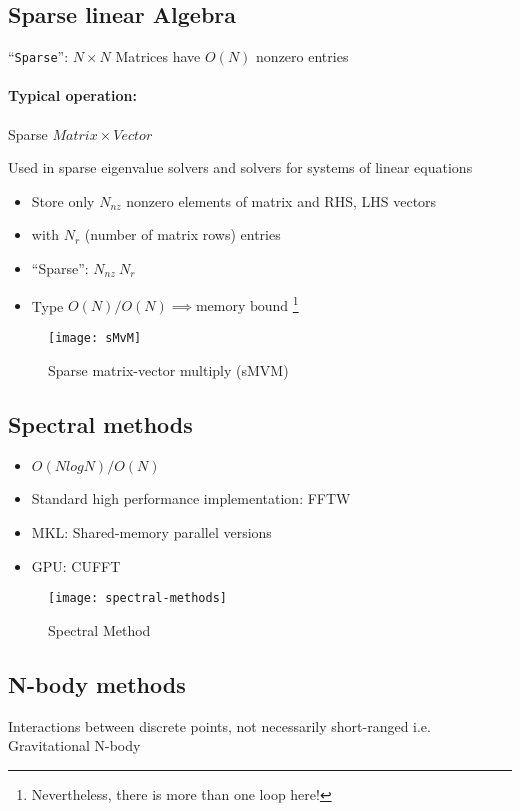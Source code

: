 \subsection{Sparse linear Algebra}
“\verb|Sparse|”: $ N \times N $ Matrices have $ O(N) $ nonzero entries

\paragraph{Typical operation:} Sparse $ Matrix \times Vector $

Used in sparse eigenvalue solvers and solvers for systems of linear equations
\begin{itemize}
    \item Store only $ N_{nz} $ nonzero elements of matrix and RHS, LHS vectors
    \item with $ N_r $ (number of matrix rows) entries
    \item “Sparse”: $ N_{nz} ~ N_r $
    \item Type $ O(N)/O(N) \implies \text{memory bound} $ \footnote{Nevertheless, there is more than one loop here!}
\end{itemize}

\begin{figure}[!htbp]
    \centering
    \texttt{[image: sMvM]}
    \caption{Sparse matrix-vector multiply (sMVM)}
\end{figure}

\subsection{Spectral methods}
\begin{itemize}
    \item $ O(N log N)/O(N) $
    \item Standard high performance implementation: FFTW
    \item MKL: Shared-memory parallel versions
    \item GPU: CUFFT
\end{itemize}
\begin{figure}[!htbp]
    \centering
    \texttt{[image: spectral-methods]}
    \caption{Spectral Method}
\end{figure}

\subsection{N-body methods}
Interactions between discrete points, not necessarily short-ranged i.e. Gravitational N-body

